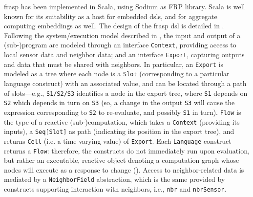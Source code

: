 \ac{frasp} has been implemented in Scala, using Sodium as FRP library. Scala is well known for its suitability as a host for embedded \ac{dsl}s, and for aggregate computing embeddings as well. The design of the \ac{frasp} \ac{dsl} is
detailed in . Following the system/execution model described in , the input and output of a (sub-)program are modeled through an interface \texttt{Context}, providing access to local sensor data and neighbor data; and an interface \texttt{Export}, capturing outputs and data that must be shared with neighbors. In particular, an \texttt{Export} is modeled as a tree where each node is a \texttt{Slot} (corresponding to a particular language construct) with an associated value, and can be located through a path of slots—e.g., \texttt{S1/S2/S3} identifies a node in the export tree, where \texttt{S1} depends on \texttt{S2} which depends in turn on \texttt{S3} (so, a change in the output \texttt{S3} will cause the expression corresponding to \texttt{S2} to re-evaluate, and possibly \texttt{S1} in turn). \texttt{Flow} is the type of a reactive (sub-)computation, which takes a \texttt{Context} (providing its inputs), a \texttt{Seq[Slot]} as path (indicating its position in the export tree), and returns \texttt{Cell} (i.e. a time-varying value) of \texttt{Export}. Each \texttt{Language} construct returns a \texttt{Flow}: therefore, the constructs do not immediately run upon evaluation, but rather an executable, reactive object denoting a computation graph whose nodes will execute as a response to change (). Access to neighbor-related data is mediated by a \texttt{NeighborField} abstraction, which is the same provided by constructs supporting interaction with neighbors, i.e., \texttt{nbr} and \texttt{nbrSensor}.

